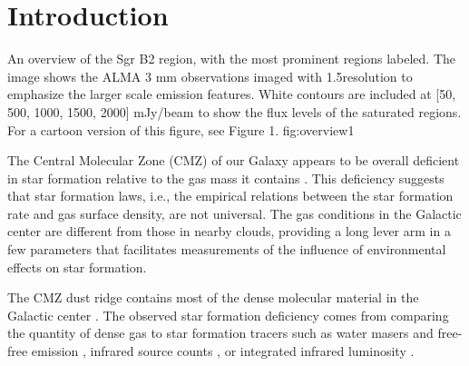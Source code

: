 \documentclass[twocolumn]{aastex61}
\begin{document}



\section{Introduction}

{An overview of the Sgr B2 region, with the most prominent regions labeled.
The image shows the ALMA 3 mm observations imaged with 1.5\arcsec resolution
to emphasize the larger scale emission features.  White contours
are included at [50, 500, 1000, 1500, 2000] mJy/beam to show the flux levels
of the saturated regions.  For a cartoon version of this
figure, see \citet{Schmiedeke2016a} Figure 1.}
{fig:overview}{1}{\textwidth}

The Central Molecular Zone (CMZ) of our Galaxy appears to be overall deficient
in star formation relative to the gas mass it contains
\citep{Guesten1983b,Morris1996a,Beuther2012a,Immer2012a,Longmore2013b,
Kauffmann2017c,Kauffmann2017b,Barnes2017b}.  This deficiency
suggests that star formation laws, i.e., the empirical relations between
the star formation rate and gas surface density, are not universal.  The gas
conditions in the Galactic center are different from those in nearby clouds,
providing a long lever arm in a few
parameters \citep[e.g., pressure, temperature, velocity
dispersion;
][]{Kruijssen2013a,Ginsburg2016a,Immer2016a,Shetty2012a,Henshaw2016a} that
facilitates measurements of the influence of environmental effects on star
formation.

The CMZ dust ridge contains most of the dense molecular material in the
Galactic center \citep{Lis1999a,Bally2010a,Molinari2011a}.  The observed star
formation deficiency comes from comparing the quantity of dense gas to  star
formation tracers such as water masers and free-free emission
\citep{Longmore2013b}, infrared source counts \citep{Yusef-Zadeh2009a}, or
integrated infrared luminosity \citep{Barnes2017b}. 
\end{document}
